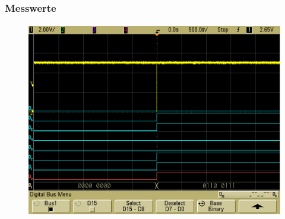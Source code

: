 \begin{frame}
    \frametitle{Messwerte}
    \framesubtitle{}
            \begin{figure}[H]
            \begin{center}
                    \includegraphics[scale=0.2]{./img/oszi/scope_9.png}
            \end{center}
            \end{figure}
            \begin{center}
            \end{center}
\end{frame}

